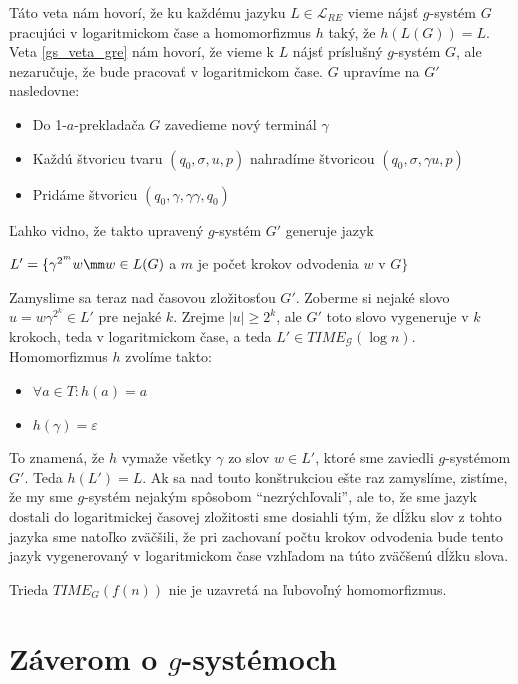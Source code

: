 \begin{dokaz}
Táto veta nám hovorí, že ku každému jazyku $L\in\mathcal{L}_{RE}$
vieme nájsť $g$-systém $G$ pracujúci v logaritmickom čase a
homomorfizmus $h$ taký, že $h(L(G))=L$. Veta \ref{gs_veta_gre} nám
hovorí, že vieme k $L$ nájsť príslušný $g$-systém $G$, ale
nezaručuje, že bude pracovať v logaritmickom čase. $G$ upravíme na
$G'$ nasledovne:
\begin{itemize}
\item Do 1-$a$-prekladača $G$ zavedieme nový terminál $\gamma$
\item Každú štvoricu tvaru $(q_0,\sigma ,u,p)$ nahradíme štvoricou $(q_0,\sigma ,\gamma u,p)$
\item Pridáme štvoricu $(q_0,\gamma,\gamma\gamma,q_0)$
\end{itemize}
Ľahko vidno, že takto upravený $g$-systém $G'$ generuje jazyk

\centerline{$L'=\{\gamma^{2^m} w\mm w\in L(G)$ a $m$ je počet
krokov odvodenia $w$ v $G\}$} Zamyslime sa teraz nad časovou
zložitosťou $G'$. Zoberme si nejaké slovo $u=w{\gamma}^{2^k}\in
L'$ pre nejaké $k$. Zrejme $|u|\geq 2^k$, ale $G'$ toto slovo
vygeneruje v $k$ krokoch, teda v logaritmickom čase, a teda $L'\in
TIME_{\mathcal{G}}(\log n)$. Homomorfizmus $h$ zvolíme takto:
\begin{itemize}
\item $\forall a\in T: h(a)=a$
\item $h(\gamma)=\varepsilon$
\end{itemize}
To znamená, že $h$ vymaže všetky $\gamma$ zo slov $w\in L'$, ktoré
sme zaviedli $g$-systémom $G'$. Teda $h(L')=L$. Ak sa nad touto
konštrukciou ešte raz zamyslíme, zistíme, že my sme $g$-systém
nejakým spôsobom ``nezrýchľovali'', ale to, že sme jazyk dostali
do logaritmickej časovej zložitosti sme dosiahli tým, že dĺžku
slov z tohto jazyka sme natoľko zväčšili, že pri zachovaní počtu
krokov odvodenia bude tento jazyk vygenerovaný v logaritmickom
čase vzhľadom na túto zväčšenú dĺžku slova.
\end{dokaz}

\begin{dosledok}
Trieda $TIME_{G}(f(n))$ nie je uzavretá na ľubovoľný
homomorfizmus.
\end{dosledok}

\section{Záverom o $g$-systémoch}

